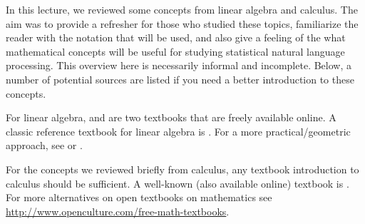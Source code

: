 In this lecture,
we reviewed some concepts from linear algebra and calculus.
The aim was to
provide a refresher for those who studied these topics,
familiarize the reader with the notation that will be used,
and also give a feeling of the what mathematical concepts will be useful
for studying statistical natural language processing.
This overview here is necessarily informal and incomplete.
Below, a number of potential sources are listed if you need a better introduction to these concepts.

For linear algebra,
\textcite{cherney2013} and \textcite{beezer2016} are
two textbooks that are freely available online.
A classic reference textbook for linear algebra is \textcite{strang2009}.
For a more practical/geometric approach,
see \textcite{farin2014} or \textcite{shifrin2011}.

For the concepts we reviewed briefly from calculus,
any textbook introduction to calculus should be sufficient.
A well-known (also available online) textbook is \textcite{strang1991}.
For more alternatives on open textbooks on mathematics see
\url{http://www.openculture.com/free-math-textbooks}.
